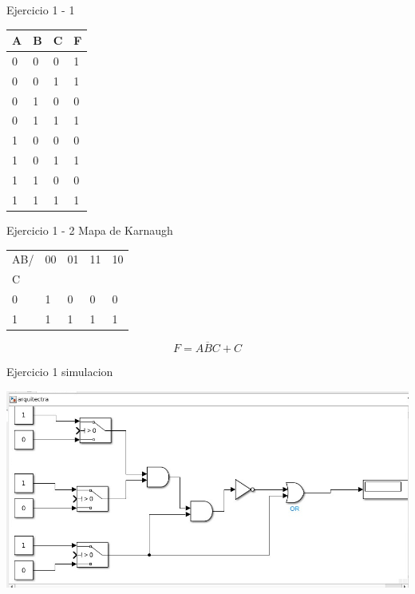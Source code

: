 \documentclass[presentation]{beamer}
\begin{document}
\begin{frame}[label={sec:org369314a}]{Ejercicio 1 - 1}
\begin{center}
\begin{tabular}{|l|l|l|l|}
\hline
A & B & C & F \\
\hline
0 & 0 & 0 & 1 \\
\hline
0 & 0 & 1 & 1 \\
\hline
0 & 1 & 0 & 0 \\
\hline
0 & 1 & 1 & 1 \\
\hline
1 & 0 & 0 & 0 \\
\hline
1 & 0 & 1 & 1 \\
\hline
1 & 1 & 0 & 0 \\
\hline
1 & 1 & 1 & 1 \\
\hline
\end{tabular}
\end{center}
\end{frame}

\begin{frame}[label={sec:orgcdeb460}]{Ejercicio 1 - 2}
Mapa de Karnaugh
\begin{center}
\begin{tabular}{|l|l|l|l|l|}
\hline
AB/ & 00 & 01 & 11 & 10 \\
C & & & & \\
\hline
0 & 1 & 0 & 0 & 0 \\
\hline
1 & 1 & 1 & 1 & 1 \\
\hline
\end{tabular}
\end{center}

$$F = \overline{ABC} + C$$
\end{frame}

\begin{frame}[label={sec:orgaed0439}]{Ejercicio 1 simulacion}
\begin{center}
\includegraphics[width=.9\linewidth]{./ejercicio1_simulacion.png}
\end{center}
\end{frame}
\end{document}
